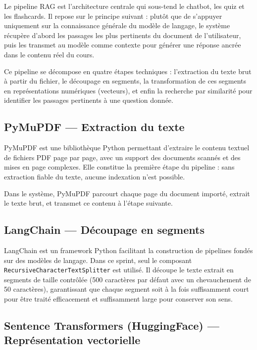 Le pipeline RAG est l'architecture centrale qui sous-tend le chatbot, les quiz et les flashcards. Il repose sur le principe suivant : plutôt que de s'appuyer uniquement sur la connaissance générale du modèle de langage, le système récupère d'abord les passages les plus pertinents du document de l'utilisateur, puis les transmet au modèle comme contexte pour générer une réponse ancrée dans le contenu réel du cours.

Ce pipeline se décompose en quatre étapes techniques : l'extraction du texte brut à partir du fichier, le découpage en segments, la transformation de ces segments en représentations numériques (vecteurs), et enfin la recherche par similarité pour identifier les passages pertinents à une question donnée.

\subsection{PyMuPDF — Extraction du texte}

PyMuPDF \cite{pymupdf} est une bibliothèque Python permettant d'extraire le contenu textuel de fichiers PDF page par page, avec un support des documents scannés et des mises en page complexes. Elle constitue la première étape du pipeline : sans extraction fiable du texte, aucune indexation n'est possible.

Dans le système, PyMuPDF parcourt chaque page du document importé, extrait le texte brut, et transmet ce contenu à l'étape suivante.

\subsection{LangChain — Découpage en segments}

LangChain \cite{langchain} est un framework Python facilitant la construction de pipelines fondés sur des modèles de langage. Dans ce sprint, seul le composant \texttt{RecursiveCharacterTextSplitter} est utilisé. Il découpe le texte extrait en segments de taille contrôlée (500 caractères par défaut avec un chevauchement de 50 caractères), garantissant que chaque segment soit à la fois suffisamment court pour être traité efficacement et suffisamment large pour conserver son sens.

\subsection{Sentence Transformers (HuggingFace) — Représentation vectorielle}

